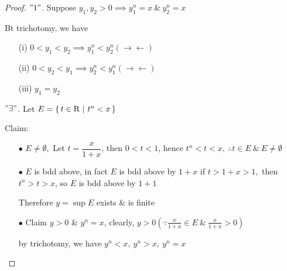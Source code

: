 \begin{proof}
	$"1"$. Suppose $y_1,y_2 > 0 \implies y_1^n = x ~\&~ y_2^n = x$
	
	Bt trichotomy,  we have 
	
	\begin{enumerate}
		\item[(i)]  $0<y_1<y_2 \implies y_1^n < y_2^n (\rightarrow\leftarrow)$
		\item[(ii)] $0 < y_2 < y_1 \implies y_2^n < y_1^n (\rightarrow\leftarrow)$
		\item[(iii)] $y_1 = y_2$
	\end{enumerate}
	
	$"\exists"$. Let $E = \left\{ \,t \in \mathrm{R}~|~t^n < x \,\right\}$
	
	Claim:
	
	\begin{enumerate}
		\item[$\bullet$] $E \neq \emptyset,$ Let $t = \dfrac{x}{1+x}$, then $0<t<1$, hence $t^n < t < x,~ \therefore t \in E ~\&~ E \neq \emptyset$
		\item[$\bullet$] $E$ is bdd above, in fact $E$ is bdd above by $1+x$ if $t>1+x>1,$ then $t^n > t>x$, so $E$ is bdd above by $1+1$
		
		Therefore $y = \sup E$ exists \& is finite
		\item[$\bullet$] Claim $y > 0$ \& $y^n = x$, clearly, $y>0(\because \frac{x}{1+x} \in E ~\&~\frac{x}{1+x}>0 )$
		
		by trichotomy, we have $y^n<x ,~y^n>x,~y^n=x$
	\end{enumerate}
\end{proof}














